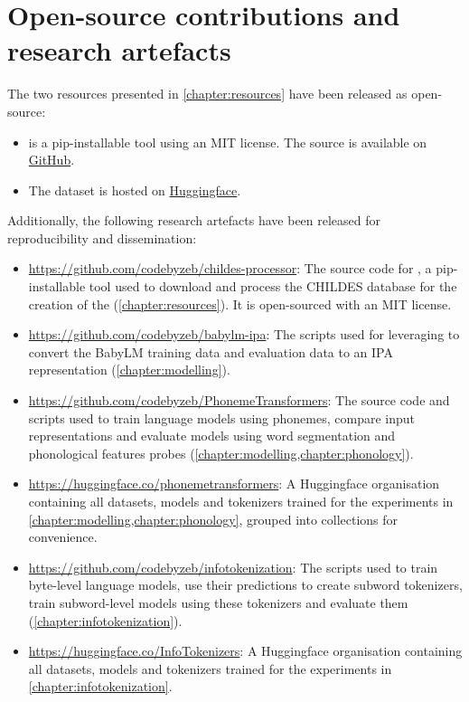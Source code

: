 \section{Open-source contributions and research artefacts}

The two resources presented in \cref{chapter:resources} have been released as open-source:

\begin{itemize}
\item \gpp is a pip-installable tool using an MIT license. The source is available on \href{https://github.com/codebyzeb/g2p-plus}{GitHub}. 
\item The \ipachildes dataset is hosted on \href{https://huggingface.co/datasets/phonemetransformers/IPA-CHILDES}{Huggingface}.
\end{itemize}

Additionally, the following research artefacts have been released for reproducibility and dissemination:

\begin{itemize}
    \item \href{https://github.com/codebyzeb/childes-processor}{https://github.com/codebyzeb/childes-processor}: The source code for \childesprocessor, a pip-installable tool used to download and process the CHILDES database for the creation of the \ipachildes (\cref{chapter:resources}). It is open-sourced with an MIT license.
    \item \href{https://github.com/codebyzeb/babylm-ipa}{https://github.com/codebyzeb/babylm-ipa}: The scripts used for leveraging \gpp to convert the BabyLM training data and evaluation data to an IPA representation (\cref{chapter:modelling}).
    \item \href{https://github.com/codebyzeb/PhonemeTransformers}{https://github.com/codebyzeb/PhonemeTransformers}: The source code and scripts used to train language models using phonemes, compare input representations and evaluate models using word segmentation and phonological features probes (\cref{chapter:modelling,chapter:phonology}). 
    \item \href{https://huggingface.co/phonemetransformers}{https://huggingface.co/phonemetransformers}: A Huggingface organisation containing all datasets, models and tokenizers trained for the experiments in \cref{chapter:modelling,chapter:phonology}, grouped into collections for convenience.
    \item \href{https://github.com/codebyzeb/infotokenization}{https://github.com/codebyzeb/infotokenization}: The scripts used to train byte-level language models, use their predictions to create subword tokenizers, train subword-level models using these tokenizers and evaluate them (\cref{chapter:infotokenization}).
    \item \href{https://huggingface.co/InfoTokenizers}{https://huggingface.co/InfoTokenizers}: A Huggingface organisation containing all datasets, models and tokenizers trained for the experiments in \cref{chapter:infotokenization}.
\end{itemize}

